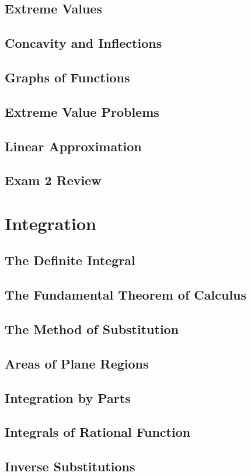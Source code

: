 \documentclass[12pt]{memoir}
\begin{document}
    \section{Extreme Values}
    
    \section{Concavity and Inflections}
    
    \section{Graphs of Functions}
    
    \section{Extreme Value Problems}
    
    \section{Linear Approximation}
    
    \section{Exam 2 Review}
    


\chapter{Integration}
    \section{The Definite Integral}
    
    \section{The Fundamental Theorem of Calculus}
    
    \section{The Method of Substitution}
    
    \section{Areas of Plane Regions}
    
    \section{Integration by Parts}
    
    \section{Integrals of Rational Function}
    
    \section{Inverse Substitutions}
    
\end{document}
